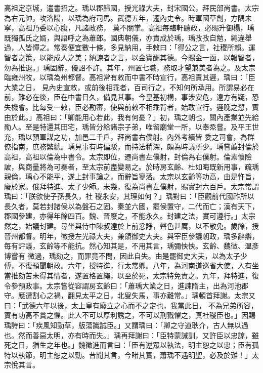 \begin{pinyinscope}
 高祖定京城，遣書招之。瑀以郡歸國，授光祿大夫，封宋國公，拜民部尚書。太宗為右元帥，攻洛陽，以瑀為府司馬。武德五年，遷內史令。時軍國草創，方隅未寧，高祖乃委以心腹，凡諸政務，
 莫不關掌。高祖每臨軒聽政，必賜升御榻，瑀既獨孤氏之婿，與語呼之為蕭郎。國典朝儀，亦責成於瑀，瑀孜孜自勉，繩違舉過，人皆憚之。常奏便宜數十條，多見納用，手敕曰：「得公之言，社稷所賴。運智者之策，以能成人之美；納諫者之言，以金寶酬其德。今賜金一函，以報智者，勿為推退。」瑀固辭，優詔不許。其年，州置七職，務取才望兼美者為之。及太宗臨雍州牧，以瑀為州都督。高祖常有敕而中書不時宣行，高祖責其遲，瑀曰：「臣大業之日，
 見內史宣敕，或前後相乖者，百司行之，不知何所承用。所謂易必在前，難必在後，臣在中書日久，備見其事。今皇基初構，事涉安危，遠方有疑，恐失機會。比每受一敕，臣必勘審，使與前敕不相乖背者，始敢宣行。遲晚之愆，實由於此。」高祖曰：「卿能用心若此，我有何憂？」初，瑀之朝也，關內產業並先給勛人。至是特還其田宅，瑀皆分給諸宗子弟，唯留廟堂一所，以奉烝嘗。及平王世充，瑀以預軍謀之功，加邑二千戶，拜尚書右僕射。內外考績皆
 委之司會，為群僚指南，庶務繁總。瑀見事有時偏駁，而持法稍深，頗為時議所少。瑀嘗薦封倫於高祖，高祖以倫為中書令。太宗即位，遷尚書左僕射，封倫為右僕射。倫素懷險詖，與商量將為可奏者，至太宗前盡變易之。於時房玄齡、杜如晦既新用事，疏瑀親倫，瑀心不能平，遂上封事論之，而辭旨寥落。太宗以玄齡等功高，由是忤旨，廢於家。俄拜特進、太子少師。未幾，復為尚書左僕射，賜實封六百戶。太宗常謂瑀曰：「朕欲使子孫長久，社
 稷永安，其理如何？」瑀對曰：「臣觀前代國祚所以長久者，莫若封諸侯以為盤石之固。秦並六國，罷侯置守，二代而亡；漢有天下，郡國參建，亦得年餘四百。魏、晉廢之，不能永久。封建之法，實可遵行。」太宗然之，始議封建。尋坐與侍中陳叔達於上前忿諍，聲色甚厲，以不敬免。歲餘，授晉州都督。明年，徵授左光祿大夫，兼領御史大夫。與宰臣參議朝政，瑀多辭辯，每有評議，玄齡等不能抗。然心知其是，不用其言，瑀彌怏怏。玄齡、魏徵、溫彥博嘗有
 微過，瑀劾之，而罪竟不問，因此自失。由是罷御史大夫，以為太子少傅，不復預聞朝政。六年，授特進，行太常卿。八年，為河南道巡省大使，人有坐當推劾苦未得其情者，遂置格置繩，以至於死，太宗特免責之。九年，拜特進，復令參預政事。太宗嘗從容謂房玄齡曰：「蕭瑀大業之日，進諫隋主，出為河池郡守。應遭割心之禍，翻見太平之日，北叟失馬，事亦難常。」瑀頓首拜謝。太宗又曰：「武德六年以後，太上皇有廢立之心而不之定也，我當此日，
 不為兄弟所容，實有功高不賞之懼。此人不可以厚利誘之，不可以刑戮懼之，真社稷臣也。」因賜瑀詩曰：「疾風知勁草，版蕩識誠臣。」又謂瑀曰：「卿之守道耿介，古人無以過也。然而善惡太明，亦有時而失。」瑀再拜謝曰：「臣特蒙誡訓，又許臣以忠諒，雖死之日，猶生之年也。」魏徵進而言曰：「臣有逆眾以執法，明主恕之以忠；臣有孤特以執節，明主恕之以勁。昔聞其言，今睹其實，蕭瑀不遇明聖，必及於難！」太宗悅其言。




\end{pinyinscope}
